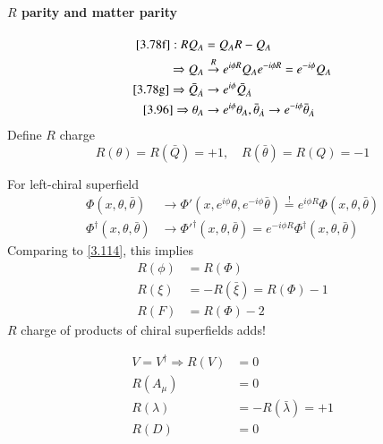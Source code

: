\paragraph{$R$ parity and matter parity}
\begin{subequations}
   \label{3.135}
\begin{align}
   \eqref{3.78f}: R Q_A &= Q_A R - Q_A \notag \\
   \Rightarrow Q_A &\stackrel{R}{\rightarrow} e^{i\phi R} Q_A e^{-i\phi R} = e^{-i\phi} Q_A \label{3.135a} \\
   \eqref{3.78g} \Rightarrow \bar Q_{\dot{A}} &\rightarrow e^{i\phi} \bar Q_{\dot{A}} \label{3.135b} \\
   \eqref{3.96} \Rightarrow \theta_A &\rightarrow e^{i\phi} \theta_A, \bar\theta_{\dot{A}} \rightarrow e^{-i\phi} \bar\theta_{\dot{A}}
\end{align}
\end{subequations}
Define $R$ charge
\begin{equation}
   R(\theta) = R(\bar Q) = +1, \quad R(\bar \theta) = R(Q) = -1 \label{3.136}
\end{equation}

For left-chiral superfield
\begin{subequations}
   \label{3.137}
\begin{align}
   \Phi(x, \theta,\bar\theta) &\rightarrow \Phi'(x, e^{i\phi}\theta, e^{-i\phi}\bar\theta ) \stackrel{!}{=} e^{i\phi R} \Phi(x, \theta, \bar\theta) \label{3.137a} \\
   \Phi^\dagger (x, \theta, \bar\theta) &\rightarrow \Phi'^\dagger (x,\theta,\bar\theta) = e^{-i\phi R} \Phi^\dagger (x, \theta, \bar\theta) \label{3.137b}
\end{align}
\end{subequations}
Comparing to \eqref{3.114}, this implies
\begin{subequations}
   \label{3.137}
\begin{align}
   R(\phi) &= R(\Phi) \label{3.138a} \\
   R(\xi) &= -R(\bar\xi) = R(\Phi) - 1 \label{3.138b} \\
   R(F) &= R(\Phi) - 2 \label{3.138c}
\end{align}
\end{subequations}
$R$ charge of products of chiral superfields adds!

\begin{subequations}
   \label{3.139}
\begin{align}
   V = V^\dagger \Rightarrow R(V) &= 0 \label{3.139a} \\
   R(A_\mu) &= 0 \label{3.139b}\\
   R(\lambda) &= - R(\bar\lambda) = +1 \label{3.139c}\\
   R(D) &= 0 \label{3.139d}
\end{align}
\end{subequations}

